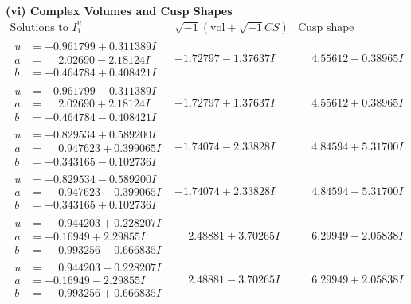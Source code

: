 \documentclass[1p]{elsarticle_modified}
\theoremstyle{definition}
\newcommand{\I}{\sqrt{-1}}
\begin{document}
\newpage\flushleft \textbf{(vi) Complex Volumes and Cusp Shapes}
$$\begin{array}{c|c|c}  
\text{Solutions to }I^u_{1}& \I (\text{vol} + \sqrt{-1}CS) & \text{Cusp shape}\\
 \hline 
\begin{aligned}
u &= -0.961799 + 0.311389 I \\
a &= \phantom{-}2.02690 - 2.18124 I \\
b &= -0.464784 + 0.408421 I\end{aligned}
 & -1.72797 - 1.37637 I & \phantom{-}4.55612 - 0.38965 I \\ \hline\begin{aligned}
u &= -0.961799 - 0.311389 I \\
a &= \phantom{-}2.02690 + 2.18124 I \\
b &= -0.464784 - 0.408421 I\end{aligned}
 & -1.72797 + 1.37637 I & \phantom{-}4.55612 + 0.38965 I \\ \hline\begin{aligned}
u &= -0.829534 + 0.589200 I \\
a &= \phantom{-}0.947623 + 0.399065 I \\
b &= -0.343165 - 0.102736 I\end{aligned}
 & -1.74074 - 2.33828 I & \phantom{-}4.84594 + 5.31700 I \\ \hline\begin{aligned}
u &= -0.829534 - 0.589200 I \\
a &= \phantom{-}0.947623 - 0.399065 I \\
b &= -0.343165 + 0.102736 I\end{aligned}
 & -1.74074 + 2.33828 I & \phantom{-}4.84594 - 5.31700 I \\ \hline\begin{aligned}
u &= \phantom{-}0.944203 + 0.228207 I \\
a &= -0.16949 + 2.29855 I \\
b &= \phantom{-}0.993256 - 0.666835 I\end{aligned}
 & \phantom{-}2.48881 + 3.70265 I & \phantom{-}6.29949 - 2.05838 I \\ \hline\begin{aligned}
u &= \phantom{-}0.944203 - 0.228207 I \\
a &= -0.16949 - 2.29855 I \\
b &= \phantom{-}0.993256 + 0.666835 I\end{aligned}
 & \phantom{-}2.48881 - 3.70265 I & \phantom{-}6.29949 + 2.05838 I \\ \hline\begin{aligned}

\end{aligned}
\end{array}$$
\end{document}
